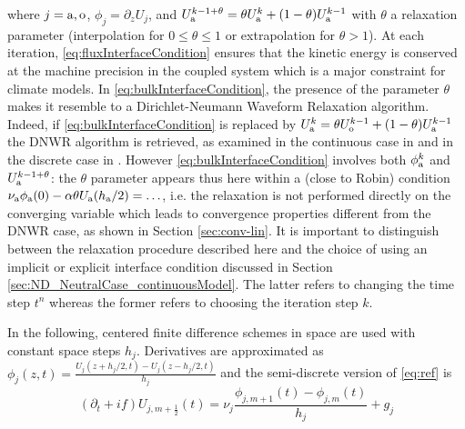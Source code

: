%
where $j={\rm a},{\rm o}$, $\phi_j = \partial_z U_j$, and 
$U_{\rm a}^{k-1+\theta} = \theta U_{\rm a}^{k} + (1-\theta) U_{\rm a}^{k-1}$
with $\theta$ a relaxation parameter (interpolation for $0\leq \theta \leq 1$ or extrapolation for $\theta>1$). 
%
%
At each iteration, \eqref{eq:fluxInterfaceCondition} ensures that the 
kinetic energy is conserved at the machine precision in the coupled 
system which is a major constraint for climate models. 
In \eqref{eq:bulkInterfaceCondition},
the presence of the parameter $\theta$ makes it resemble to a Dirichlet-Neumann Waveform Relaxation algorithm.
Indeed, if \eqref{eq:bulkInterfaceCondition} is replaced
by $U_{\rm a}^k = \theta U_{\rm o}^{k-1} + (1-\theta) U_{\rm a}^{k-1}$ the DNWR algorithm is retrieved, as examined in the continuous case in \cite{gander_dirichlet-neumann_2014} and in the discrete case in
\cite{meisrimel_time_2020}.
However \eqref{eq:bulkInterfaceCondition}
involves both $\phi_{\rm a}^k$ and 
$U_{\rm a}^{k-1+\theta}$:
the $\theta$ parameter appears thus here within a (close to Robin) condition  
$\nu_{\rm a} \phi_{\rm a}(0) - \alpha \theta U_{\rm a}(h_{\rm a}/2) = \ldots$,
i.e. the relaxation is not performed directly on the converging variable
which leads to convergence properties different from the DNWR case, 
as shown in Section \ref{sec:conv-lin}.
It is important to distinguish between the relaxation
procedure described here and the choice of using an implicit or
explicit interface condition discussed in Section
\ref{sec:ND_NeutralCase_continuousModel}.
The latter refers to changing the time step $t^n$ whereas the former
refers to choosing the iteration step $k$.
\par
%
In the following, centered finite difference schemes in space are used with constant space steps $h_j$.
Derivatives are approximated as $\phi_j(z,t) = \frac{U_j(z+h_j/2,t) - U_j(z-h_j/2, t)}{h_j}$
and the semi-discrete version of \eqref{eq:ref} is
\begin{equation}\label{eq:spaceTimeScheme}
	(\partial_t + if) U_{j, m+\frac{1}{2}} (t) = \nu_j \frac{\phi_{j,m+1}(t) - \phi_{j,m}(t)}{h_j} + g_j
\end{equation}

